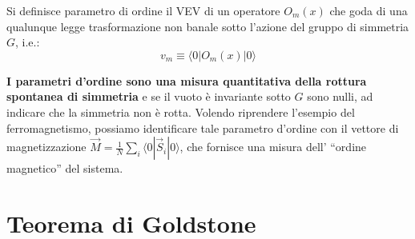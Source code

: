 \documentclass[../main.tex]{subfiles}
\begin{document}
\begin{itemize}
\begin{definition}
        Si definisce parametro di ordine il VEV di un operatore $O_m(x)$ che goda di una qualunque legge trasformazione non banale sotto l'azione del gruppo di simmetria $G$, i.e.:
        \begin{equation}
            \boxed{v_m \equiv \langle 0|O_m(x)|0\rangle}
            \label{eq:order_parameters}
        \end{equation}
    \end{definition}
   \textbf{ I parametri d'ordine sono una misura quantitativa della rottura spontanea di simmetria} e se il vuoto è invariante sotto $G$ sono nulli, ad indicare che la simmetria non è rotta. Volendo riprendere l'esempio del ferromagnetismo, possiamo identificare tale parametro d'ordine con il vettore di magnetizzazione $\Vec{M} = \frac{1}{N}\sum_i\langle 0|\Vec{S}_i|0\rangle$, che fornisce una misura dell' “ordine magnetico” del sistema.
\end{itemize}

\section{Teorema di Goldstone}
\end{document}
